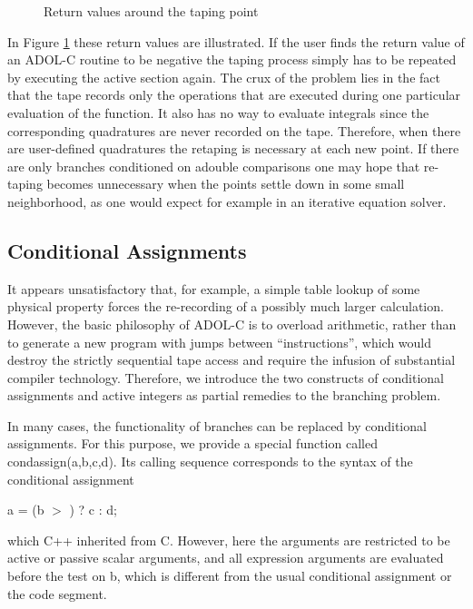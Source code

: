 \documentclass[11pt,twoside]{article}
\begin{document}
\begin{figure}[h]
\centering{}
\caption{Return values around the taping point}
\label{fi:tap_point}
\end{figure}          

In Figure \ref{fi:tap_point} these return values are illustrated.
If the user finds the return value of an ADOL-C routine to be negative the
taping process simply has to be repeated by executing the active section again.
The crux of the problem lies in the fact that the tape records only
the operations that are executed during one particular evaluation of the 
function.
It also has no way to evaluate integrals since the corresponding
quadratures are never recorded on the tape. 
Therefore, when there are user-defined quadratures the retaping is necessary at each
new point. If there are only branches conditioned on {\sf adouble}
comparisons one may hope that re-taping becomes unnecessary when
the points settle down in some small neighborhood, as one would 
expect for example in an iterative equation solver. 
%
\subsection{Conditional Assignments}
\label{condassign}
%
It appears unsatisfactory that, for example, a simple table lookup 
of some physical property forces the re-recording of a possibly 
much larger calculation. However, the basic philosophy of ADOL-C 
is to overload arithmetic, rather than to generate a new program
with jumps between ``instructions'', which would destroy the 
strictly sequential tape access and
require the infusion of substantial compiler technology. 
Therefore, we introduce the two constructs of conditional
assignments and active integers as partial remedies to the
branching problem. 

In many cases, the functionality of branches 
can be replaced by conditional assignments.  
For this purpose, we provide a special function called
{\sf condassign(a,b,c,d)}. Its calling sequence corresponds to the 
syntax of the conditional assignment
\begin{center}
    {\sf a = (b \boldmath $>$ ) ? c : d;}  
\end{center}
which C++ inherited from C. However, here the arguments are restricted to be
active or passive scalar arguments, and all expression arguments
are evaluated before the test on {\sf  b}, which is different from
the usual conditional assignment or the code segment.
\end{document}

